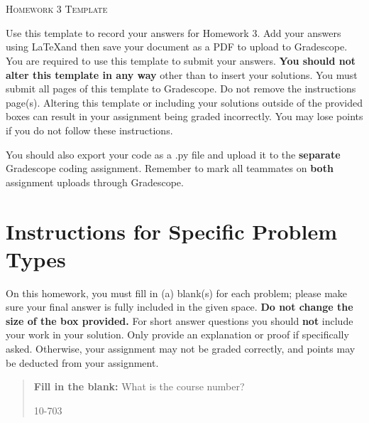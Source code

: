 \documentclass[12pt]{article}
\begin{document}
\section*{}
\begin{center}
  \centerline{\textsc{\LARGE  Homework 3 Template}}
\end{center}

Use this template to record your answers for Homework 3.  Add your answers using \LaTeX and then save your document as a PDF to upload to Gradescope.  You are required to use this template to submit your answers.  \textbf{You should not alter this template in any way} other than to insert your solutions.  You must submit all \pageref{LastPage} pages of this template to Gradescope.  Do not remove the instructions page(s).  Altering this template or including your solutions outside of the provided boxes can result in your assignment being graded incorrectly.  You may lose points if you do not follow these instructions.

You should also export your code as a .py file and upload it to the \textbf{separate} Gradescope coding assignment. Remember to mark all teammates on \textbf{both} assignment uploads through Gradescope.

\section*{Instructions for Specific Problem Types}

On this homework, you must fill in (a) blank(s) for each problem; please make sure your final answer is fully included in the given space.  \textbf{Do not change the size of the box provided.}  For short answer questions you should \textbf{not} include your work in your solution.  Only provide an explanation or proof if specifically asked.  Otherwise, your assignment may not be graded correctly, and points may be deducted from your assignment.

\begin{quote}
\textbf{Fill in the blank:} What is the course number?

\begin{tcolorbox}[fit,height=1cm, width=4cm, blank, borderline={1pt}{-2pt},valign=center,nobeforeafter]
    \begin{center}\huge10-703\end{center}
    \end{tcolorbox}
\end{quote}

\newpage
\end{document}
